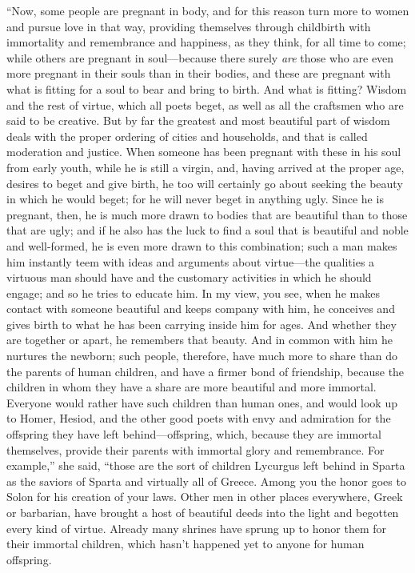 “Now, some people are pregnant in body, and for this reason turn more to
women and pursue love in that way, providing themselves through
childbirth with immortality and remembrance and happiness, as they
think, for all time to come; while others are pregnant in soul---because
there  surely {\em are} those who are even more pregnant
in their souls than in their bodies, and these are pregnant with what is
fitting for a soul to bear and bring to birth. And what is fitting?
Wisdom and the rest of virtue, which all poets beget, as well as all the
craftsmen who are said to be creative. But by far the greatest and most
beautiful part of wisdom deals with the proper ordering of cities and
households, and that is called moderation and justice. When someone has
been pregnant with these in his soul from  early youth, while he
is still a virgin, and, having arrived at the proper age, desires to
beget and give birth, he too will certainly go about seeking the beauty
in which he would beget; for he will never beget in anything ugly. Since
he is pregnant, then, he is much more drawn to bodies that are beautiful
than to those that are ugly; and if he also has the luck to find a soul
that is beautiful and noble and well-formed, he is even more drawn
 to this combination; such a man makes him instantly teem with
ideas and arguments about virtue---the qualities a virtuous man should
have and the customary activities in which he should engage; and so he
tries to educate him. In my view, you see, when he makes contact with
someone beautiful and keeps company with him, he conceives and gives
birth to what he has been carrying inside him for ages. And whether they
are together or apart, he remembers that beauty. And in common with him
he nurtures the newborn; such people, therefore, have much more to share
than do the parents of human children, and have a firmer bond of
friendship, because the children in whom they have a share are more
 beautiful and more immortal. Everyone would rather have such
children than human ones, and would look up to Homer, Hesiod, and the
other good poets with envy and admiration for the offspring they have
left behind---offspring, which, because they are immortal themselves,
provide their parents with immortal glory and remembrance. For example,”
she said, “those are the sort of children
Lycurgus left behind
in Sparta as the saviors of Sparta and virtually all of Greece. Among
you the honor goes  to Solon for his creation of your laws. Other
men in other places everywhere, Greek or barbarian, have brought a host
of beautiful deeds into the light and begotten every kind of virtue.
Already many shrines have sprung up to honor them for their immortal
children, which hasn't happened yet to anyone for human offspring.

